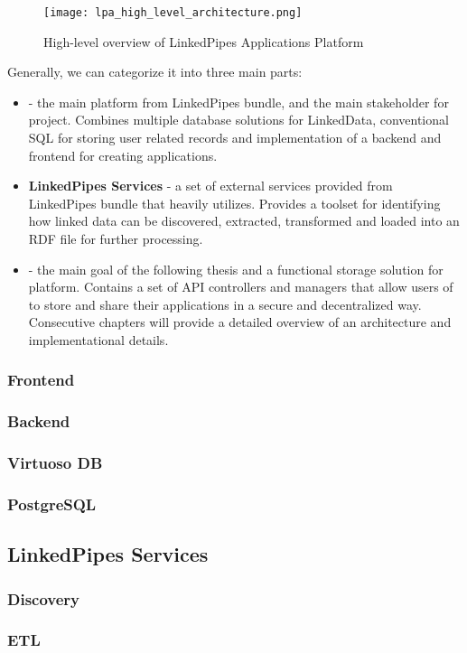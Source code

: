 \begin{figure}[h]
    \centering
    \texttt{[image: lpa\_high\_level\_architecture.png]}
    \caption{High-level overview of LinkedPipes Applications Platform}
    \label{fig:lpa-high-level-arch}
\end{figure}

Generally, we can categorize it into three main parts: 

\begin{itemize}
    \item \textbf{\lpa{}} - the main platform from LinkedPipes bundle, and the main stakeholder for \lpas{} project. Combines multiple database solutions for LinkedData, conventional SQL for storing user related records and implementation of a backend and frontend for creating applications.
    \item \textbf{LinkedPipes Services} - a set of external services provided from LinkedPipes bundle that \lpa{} heavily utilizes. Provides a toolset for identifying how linked data can be discovered, extracted, transformed and loaded into an RDF file for further processing.
    \item \textbf{\lpas{}} - the main goal of the following thesis and a functional storage solution for \lpa{} platform. Contains a set of API controllers and managers that allow users of \lpa{} to store and share their applications in a secure and decentralized way. Consecutive chapters will provide a detailed overview of an architecture and implementational details.
\end{itemize}

\subsubsection{Frontend}

\subsubsection{Backend}

\subsubsection{Virtuoso DB}

\subsubsection{PostgreSQL} 

\subsection{LinkedPipes Services} 

\subsubsection{Discovery} 

\subsubsection{ETL} 

